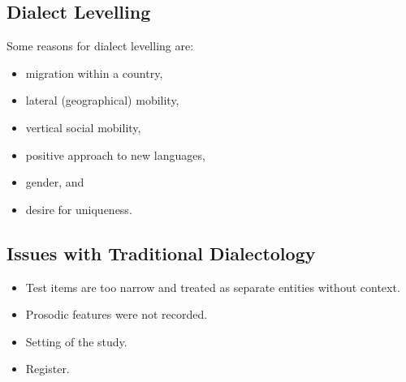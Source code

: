 \documentclass[../main.tex]{subfiles}
\begin{document}

        \subsection{Dialect Levelling}
        Some reasons for dialect levelling are: \begin{itemize}
            \item migration within a country,
            \item lateral (geographical) mobility,
            \item vertical social mobility,
            \item positive approach to new languages,
            \item gender, and
            \item desire for uniqueness.
        \end{itemize}

        \subsection{Issues with Traditional Dialectology}
        \begin{itemize}
            \item Test items are too narrow and treated as separate entities without context.
            \item Prosodic features were not recorded.
            \item Setting of the study.
            \item Register.
        \end{itemize}
        
\end{document}
